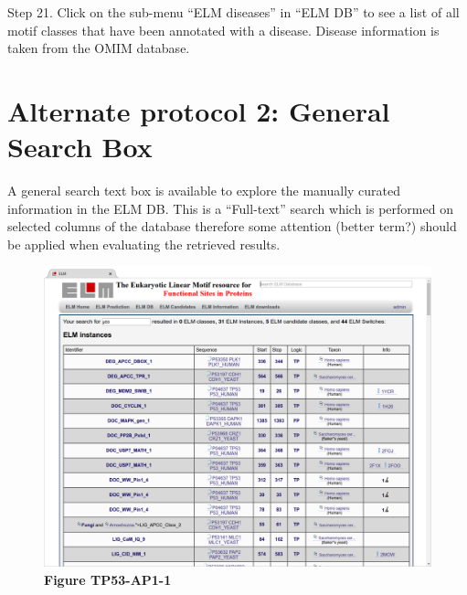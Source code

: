 Step 21. Click on the sub-menu ``ELM diseases'' in ``ELM DB'' to see a
list of all motif classes that have been annotated with a disease.
Disease information is taken from the OMIM database.


\section{Alternate protocol 2: General Search
Box}\label{alternate-protocol-2-general-search-box}

A general search text box is available to explore the manually curated
information in the ELM DB. This is a ``Full-text'' search which is
performed on selected columns of the database therefore some attention
(better term?) should be applied when evaluating the retrieved results.

\begin{figure}[h!]
\centering
\includegraphics[width=\textwidth]{Figures/TP53_3/TP53_instances.png} 
\caption{\textbf{Figure TP53-AP1-1}}
\end{figure}

